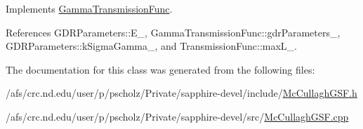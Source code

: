 Implements \hyperlink{classGammaTransmissionFunc_a68156d72ed9620f66f96dc37bbf781aa}{Gamma\-Transmission\-Func}.



References G\-D\-R\-Parameters\-::\-E\-\_\-, Gamma\-Transmission\-Func\-::gdr\-Parameters\-\_\-, G\-D\-R\-Parameters\-::k\-Sigma\-Gamma\-\_\-, and Transmission\-Func\-::max\-L\-\_\-.



The documentation for this class was generated from the following files\-:\begin{DoxyCompactItemize}
\item 
/afs/crc.\-nd.\-edu/user/p/pscholz/\-Private/sapphire-\/devel/include/\hyperlink{McCullaghGSF_8h}{Mc\-Cullagh\-G\-S\-F.\-h}\item 
/afs/crc.\-nd.\-edu/user/p/pscholz/\-Private/sapphire-\/devel/src/\hyperlink{McCullaghGSF_8cpp}{Mc\-Cullagh\-G\-S\-F.\-cpp}\end{DoxyCompactItemize}
